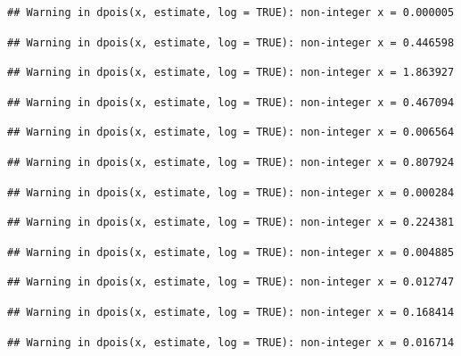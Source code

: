 \documentclass[]{article}
\begin{document}
\begin{verbatim}
## Warning in dpois(x, estimate, log = TRUE): non-integer x = 0.000005
\end{verbatim}

\begin{verbatim}
## Warning in dpois(x, estimate, log = TRUE): non-integer x = 0.446598
\end{verbatim}

\begin{verbatim}
## Warning in dpois(x, estimate, log = TRUE): non-integer x = 1.863927
\end{verbatim}

\begin{verbatim}
## Warning in dpois(x, estimate, log = TRUE): non-integer x = 0.467094
\end{verbatim}

\begin{verbatim}
## Warning in dpois(x, estimate, log = TRUE): non-integer x = 0.006564
\end{verbatim}

\begin{verbatim}
## Warning in dpois(x, estimate, log = TRUE): non-integer x = 0.807924
\end{verbatim}

\begin{verbatim}
## Warning in dpois(x, estimate, log = TRUE): non-integer x = 0.000284
\end{verbatim}

\begin{verbatim}
## Warning in dpois(x, estimate, log = TRUE): non-integer x = 0.224381
\end{verbatim}

\begin{verbatim}
## Warning in dpois(x, estimate, log = TRUE): non-integer x = 0.004885
\end{verbatim}

\begin{verbatim}
## Warning in dpois(x, estimate, log = TRUE): non-integer x = 0.012747
\end{verbatim}

\begin{verbatim}
## Warning in dpois(x, estimate, log = TRUE): non-integer x = 0.168414
\end{verbatim}

\begin{verbatim}
## Warning in dpois(x, estimate, log = TRUE): non-integer x = 0.016714
\end{verbatim}
\end{document}
